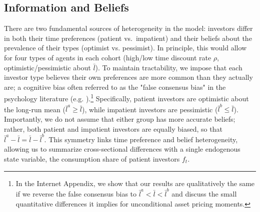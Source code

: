 \documentclass[preprint,11pt,authoryear]{elsarticle}
\theoremstyle{plain}
\begin{document}
 

\subsection{Information and Beliefs}

There are two fundamental sources of heterogeneity in the model: investors differ in both their time preferences (patient vs.~impatient) and their beliefs about the prevalence of their types (optimist vs. pessimist). In principle, this would allow for four types of agents in each cohort (high/low time discount rate $\rho$, optimistic/pessimistic about $\bar{l}$). 
 To maintain tractability, we impose that each investor type believes their own preferences are more common than they actually are; a cognitive bias often referred to as the "false consensus bias" in the psychology literature (e.g. \cite{RossGreenHouse77}).\footnote{In the Internet Appendix, we show that our results are qualitatively the same if we reverse the false consensus bias to $\bar{l}^a < \bar{l} < \bar{l}^b$ and discuss the small quantitative differences it implies for unconditional asset pricing moments.} Specifically, patient investors are optimistic about the long-run mean ($\bar{l}^a \geq \bar{l}$), while impatient investors are pessimistic ($\bar{l}^b \leq  \bar{l}$). Importantly, we do not assume that either group has more accurate beliefs; rather, both patient and impatient investors are equally biased, so that $\bar{l}^a - \bar{l} = \bar{l} - \bar{l}^b$. This symmetry links time preference and belief heterogeneity, allowing us to summarize cross-sectional differences with a single endogenous state variable, the consumption share of patient investors $f_t$. 
\end{document}

